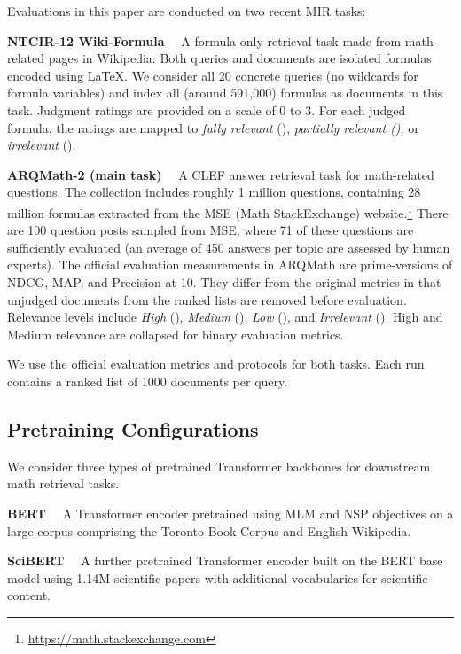 \documentclass[11pt]{article}
\begin{document}
Evaluations in this paper are conducted on two recent MIR tasks:

\smallskip \noindent
\textbf{NTCIR-12 Wiki-Formula}~\cite{zanibbi2016ntcir} \ A formula-only retrieval task made from math-related pages in Wikipedia.
Both queries and documents are isolated formulas encoded using \LaTeX{}.
We consider all 20 concrete queries (no wildcards for formula variables) and index all (around 591,000) formulas as documents in this task.
Judgment ratings are provided on a scale of 0 to 3.
For each judged formula,
the ratings are mapped to
\textit{fully relevant} (), \textit{partially relevant ()}, or \textit{irrelevant} ().

\smallskip \noindent
\textbf{ARQMath-2 (main task)}~\cite{mansouri2021arqmath2review} \ A CLEF answer retrieval task for math-related questions.
The collection includes roughly 1 million questions, containing 28 million formulas extracted from the MSE (Math StackExchange) website.\footnote{\url{https://math.stackexchange.com}}
There are 100 question posts sampled from MSE, where 71 of these questions are sufficiently evaluated (an average of 450 answers per topic are assessed by human experts). The official evaluation measurements in ARQMath are prime-versions of NDCG, MAP, and Precision at 10.
They differ from the original metrics in that unjudged documents from the ranked lists are removed before evaluation.
Relevance levels include \textit{High} (), \textit{Medium} (), \textit{Low} (), and \textit{Irrelevant} ().
High and Medium relevance are collapsed for binary evaluation metrics.

\medskip \noindent We use the official evaluation metrics and protocols for both tasks.
Each run contains a ranked list of 1000 documents per query.

\subsection{Pretraining Configurations}

We consider three types of pretrained Transformer backbones for downstream math retrieval tasks.

\smallskip \noindent
\textbf{BERT}~\cite{devlin2019bert} \  A Transformer encoder pretrained using MLM and NSP objectives on a large corpus comprising the Toronto Book Corpus and English Wikipedia.

\smallskip \noindent
\textbf{SciBERT}~\cite{beltagy2019scibert} \  A further pretrained Transformer encoder built on the BERT base model using 1.14M scientific papers with additional vocabularies for scientific content.
\end{document}
